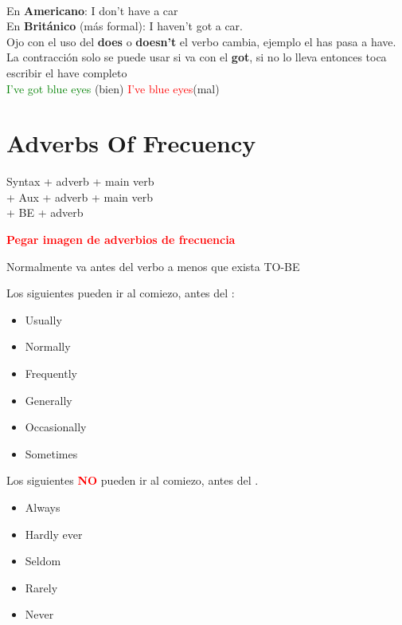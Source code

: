 \documentclass{elegantbook}
\begin{document}
        \begin{note}
            \\En \textbf{Americano}:
            I don't have a car
            \\En \textbf{Británico} (más formal):
            I haven't got a car.
            \\Ojo con el uso del \textbf{does} o \textbf{doesn't} el verbo cambia, ejemplo el has pasa a have.
            \\La contracción solo se puede usar si va con el \textbf{got}, si no lo lleva entonces toca escribir el have completo
            \\\textcolor{green}{I've got blue eyes} (bien) \textcolor{red}{I've blue eyes}(mal)
        \end{note}
        \section{Adverbs Of Frecuency}
        \begin{corollary}{Syntax}{}
            \dSmiley[2] + adverb + main verb\\
            \dSmiley[2] + Aux + adverb + main verb\\
            \dSmiley[2] + BE  + adverb
        \end{corollary}
        \textcolor{red}{\textbf{Pegar imagen de adverbios de frecuencia}}
        \begin{property}
            Normalmente va antes del verbo a menos que exista TO-BE
        \end{property}
        \begin{property}
            Los siguientes pueden ir al comiezo, antes del \dSmiley[2]:
            \begin{itemize}
                \item Usually
                \item Normally
                \item Frequently
                \item Generally
                \item Occasionally
                \item Sometimes
            \end{itemize}
        \end{property}
        \begin{property}
            Los siguientes \textbf{\textcolor{red}{NO}} pueden ir al comiezo, antes del \dSmiley[2].
            \begin{itemize}
                \item Always
                \item Hardly ever
                \item Seldom
                \item Rarely
                \item Never
            \end{itemize}
        \end{property}
\end{document}
